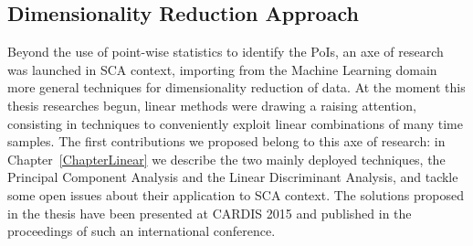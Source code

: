 \subsection{Dimensionality Reduction Approach}\label{sec:dim_red_objective}
Beyond the use of point-wise statistics to identify the PoIs, an axe of research was launched in SCA context, importing from the Machine Learning domain more general techniques for dimensionality reduction of data. At the moment this thesis researches begun, linear methods were drawing a raising attention, consisting in techniques to conveniently exploit linear combinations of many time samples. The first contributions we proposed belong to this axe of research: in Chapter~\ref{ChapterLinear} we describe the two mainly deployed techniques, the Principal Component Analysis and the Linear Discriminant Analysis, and tackle some open issues about their application to SCA context. The solutions proposed in the thesis have been presented at CARDIS 2015 \cite{cagli2015enhancing} and published in the proceedings of such an international conference.\\

